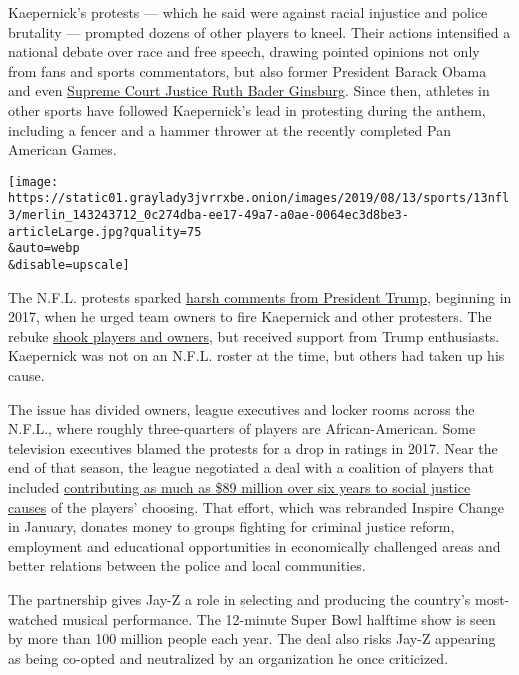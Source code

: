 Kaepernick's protests --- which he said were against racial injustice
and police brutality --- prompted dozens of other players to kneel.
Their actions intensified a national debate over race and free speech,
drawing pointed opinions not only from fans and sports commentators, but
also former President Barack Obama and even
\href{https://www.nytimes3xbfgragh.onion/2016/10/15/us/ruth-bader-ginsburg-colin-kaepernick-national-anthem.html}{Supreme
Court Justice Ruth Bader Ginsburg}. Since then, athletes in other sports
have followed Kaepernick's lead in protesting during the anthem,
including a fencer and a hammer thrower at the recently completed Pan
American Games.

\texttt{[image: https://static01.graylady3jvrrxbe.onion/images/2019/08/13/sports/13nfl3/merlin\_143243712\_0c274dba-ee17-49a7-a0ae-0064ec3d8be3-articleLarge.jpg?quality=75\\\&auto=webp\\\&disable=upscale]}

The N.F.L. protests sparked
\href{https://www.nytimes3xbfgragh.onion/2017/09/23/sports/football/trump-nfl-kaepernick.html}{harsh
comments from President Trump}, beginning in 2017, when he urged team
owners to fire Kaepernick and other protesters. The rebuke
\href{https://www.nytimes3xbfgragh.onion/2018/04/25/sports/nfl-owners-kaepernick.html}{shook
players and owners}, but received support from Trump enthusiasts.
Kaepernick was not on an N.F.L. roster at the time, but others had taken
up his cause.

The issue has divided owners, league executives and locker rooms across
the N.F.L., where roughly three-quarters of players are
African-American. Some television executives blamed the protests for a
drop in ratings in 2017. Near the end of that season, the league
negotiated a deal with a coalition of players that included
\href{https://www.nytimes3xbfgragh.onion/2017/11/29/sports/football/nfl-players-coalition.html}{contributing
as much as \$89 million over six years to social justice causes} of the
players' choosing. That effort, which was rebranded Inspire Change in
January, donates money to groups fighting for criminal justice reform,
employment and educational opportunities in economically challenged
areas and better relations between the police and local communities.

The partnership gives Jay-Z a role in selecting and producing the
country's most-watched musical performance. The 12-minute Super Bowl
halftime show is seen by more than 100 million people each year. The
deal also risks Jay-Z appearing as being co-opted and neutralized by an
organization he once criticized.

